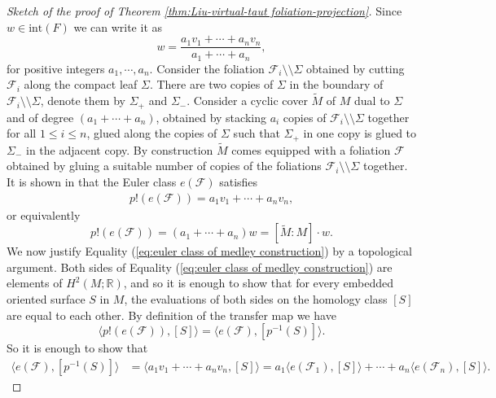 \documentclass[11pt]{amsart}
\theoremstyle{remark}
\theoremstyle{definition}
\begin{document}
\begin{proof}[Sketch of the proof of Theorem \ref{thm:Liu-virtual-taut foliation-projection}]
	Since $w \in \mathrm{int} (F) $ we can write it as 
	\[ w =  \frac{a_1 v_1 + \cdots + a_n v_n}{a_1 + \cdots + a_n},\]
	for positive integers $a_1 , \cdots, a_n$. Consider the foliation $\mathcal{F}_i \setminus \setminus \Sigma$ obtained by cutting $\mathcal{F}_i$ along the compact leaf $\Sigma$. There are two copies of $\Sigma$ in the boundary of $\mathcal{F}_i \setminus \setminus \Sigma$, denote them by $\Sigma_+$ and $\Sigma_-$. Consider a cyclic cover $\tilde{M}$ of $M$ dual to $\Sigma$ and of degree $(a_1 + \cdots + a_n)$, obtained by stacking $a_i$ copies of $\mathcal{F}_i \setminus \setminus \Sigma$ together for all $1 \leq i \leq n$, glued along the copies of $\Sigma$ such that $\Sigma_+$ in one copy is glued to $\Sigma_-$ in the adjacent copy. By construction $\tilde{M}$ comes equipped with a foliation $\mathcal{F}$ obtained by gluing a suitable number of copies of the foliations $\mathcal{F}_i \setminus \setminus \Sigma$ together. It is shown in \cite[Lemma 4.3]{liu2024criterion} that the Euler class $e(\mathcal{F})$ satisfies 
	\begin{eqnarray}
		p!(e(\mathcal{F})) = a_1 v_1 + \cdots + a_n v_n,
		\label{eq:euler class of medley construction}
	\end{eqnarray}
	or equivalently
	\[  p!(e(\mathcal{F}))  = (a_1 + \cdots + a_n) w = [\tilde{M} : M] \cdot w. \]
	We now justify Equality (\ref{eq:euler class of medley construction}) by a topological argument. Both sides of Equality (\ref{eq:euler class of medley construction}) are elements of $H^2(M ; \mathbb{R})$, and so it is enough to show that for every embedded oriented surface $S$ in $M$, the evaluations of both sides on the homology class $[S]$ are equal to each other. By definition of the transfer map we have 
	\[ \langle p!(e(\mathcal{F}))  , [S] \rangle = \langle e(\mathcal{F}) , [p^{-1}(S)] \rangle . \]
	So it is enough to show that 
	\begin{align*} \langle e(\mathcal{F}) , [p^{-1}(S)] \rangle  &= \langle  a_1 v_1 + \cdots + a_n v_n , [S] \rangle =  a_1 \langle e(\mathcal{F}_1) , [S] \rangle + \cdots + a_n  \langle e(\mathcal{F}_n) , [S] \rangle.
	\end{align*}

\end{proof}
\end{document}
